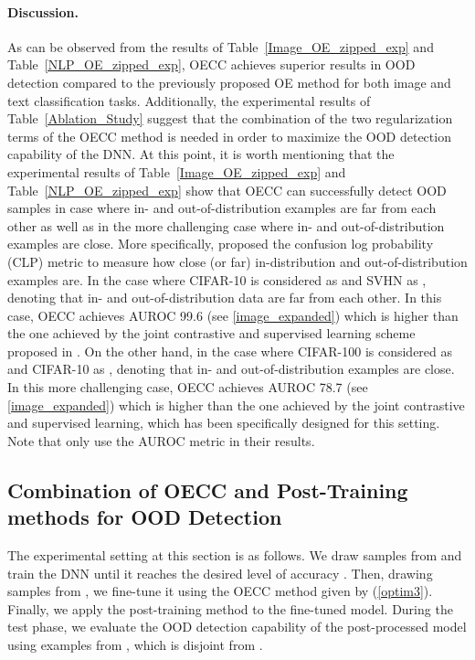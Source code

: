 \documentclass{article} \usepackage{iclr2020_conference,times}
\begin{document}
\paragraph{Discussion.} As can be observed from the results of Table~\ref{Image_OE_zipped_exp} and Table~\ref{NLP_OE_zipped_exp}, OECC achieves superior results in OOD detection compared to the previously proposed OE method \citep{hendrycks2019oe} for both image and text classification tasks. Additionally, the experimental results of Table~\ref{Ablation_Study} suggest that the combination of the two regularization terms of the OECC method is needed in order to maximize the OOD detection capability of the DNN. 
At this point, it is worth mentioning that the experimental results of Table~\ref{Image_OE_zipped_exp} and Table~\ref{NLP_OE_zipped_exp} show that OECC can successfully detect OOD samples in case where in- and out-of-distribution examples are far from each other as well as in the more challenging case where in- and out-of-distribution examples are close. More specifically, \citet{winkens2020contrastive} proposed the confusion log probability (CLP) metric to measure how close (or far) in-distribution and out-of-distribution examples are. In the case where CIFAR-10 is considered as  and SVHN as ,  denoting that in- and out-of-distribution data are far from each other. In this case, OECC achieves AUROC 99.6 (see \ref{image_expanded}) which is higher than the one achieved by the joint contrastive \citep{simCLRv1} and supervised learning scheme proposed in \citet{winkens2020contrastive}. On the other hand, in the case where CIFAR-100 is considered as  and CIFAR-10 as ,  denoting that in- and out-of-distribution examples are close. In this more challenging case, OECC achieves AUROC 78.7 (see \ref{image_expanded}) which is higher than the one achieved by the joint contrastive and supervised learning, which has been specifically designed for this setting. Note that \citet{winkens2020contrastive} only use the AUROC metric in their results.



\subsection{Combination of OECC and Post-Training methods for OOD Detection}
The experimental setting at this section is as follows. We draw samples from  and train the DNN until it reaches the desired level of accuracy . Then, drawing samples from , we fine-tune it using the OECC method given by (\ref{optim3}). Finally, we apply the post-training method to the fine-tuned model. During the test phase, we evaluate the OOD detection capability of the post-processed model using examples from , which is disjoint from .
\end{document}
